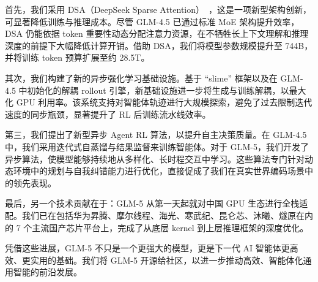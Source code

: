 首先，我们采用 DSA（DeepSeek Sparse Attention）~\cite{deepseekai2025deepseekv32pushingfrontieropen}，这是一项新型架构创新，可显著降低训练与推理成本。尽管 GLM-4.5 已通过标准 MoE 架构提升效率，DSA 仍能依据 token 重要性动态分配注意力资源，在不牺牲长上下文理解和推理深度的前提下大幅降低计算开销。借助 DSA，我们将模型参数规模提升至 744B，并将训练 token 预算扩展至约 28.5T。

其次，我们构建了新的异步强化学习基础设施。基于 ``slime'' 框架以及在 GLM-4.5 中初始化的解耦 rollout 引擎，新基础设施进一步将生成与训练解耦，以最大化 GPU 利用率。该系统支持对智能体轨迹进行大规模探索，避免了过去限制迭代速度的同步瓶颈，显著提升了 RL 后训练流水线效率。

第三，我们提出了新型异步 Agent RL 算法，以提升自主决策质量。在 GLM-4.5 中，我们采用迭代式自蒸馏与结果监督来训练智能体。对于 GLM-5，我们开发了异步算法，使模型能够持续地从多样化、长时程交互中学习。这些算法专门针对动态环境中的规划与自我纠错能力进行优化，直接促成了我们在真实世界编码场景中的领先表现。

最后，另一个技术贡献在于：GLM-5 从第一天起就对中国 GPU 生态进行全栈适配。我们已在包括华为昇腾、摩尔线程、海光、寒武纪、昆仑芯、沐曦、燧原在内的 7 个主流国产芯片平台上，完成了从底层 kernel 到上层推理框架的深度优化。

凭借这些进展，GLM-5 不只是一个更强大的模型，更是下一代 AI 智能体更高效、更实用的基础。我们将 GLM-5 开源给社区，以进一步推动高效、智能体化通用智能的前沿发展。
